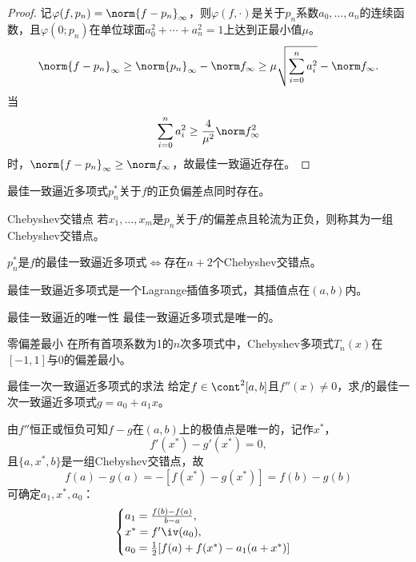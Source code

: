 \begin{proof}
    记$\varphi(f,p_n)=\norm{f-p_n}_\infty$，则$\varphi(f,\cdot)$是关于$p_n$系数$a_0,\ldots,a_n$的连续函数，且$\varphi(0;p_n)$在单位球面$a_0^2+\cdots+a_n^2=1$上达到正最小值$\mu$。
    \[
        \norm{f-p_n}_\infty\geq\norm{p_n}_\infty-\norm f_\infty\geq\mu\sqrt{\sum_{i=0}^na_i^2}-\norm f_\infty.
    \]
    当
    \[
        \sum_{i=0}^na_i^2\geq\frac4{\mu^2}\norm f_\infty^2
    \]
    时，$\norm{f-p_n}_\infty\geq\norm f_\infty$，故最佳一致逼近存在。
\end{proof}

\begin{lemma}
    最佳一致逼近多项式$p_n^*$关于$f$的正负偏差点同时存在。
\end{lemma}

\begin{definition}
    {Chebyshev交错点}{}
    若$x_1,\ldots,x_m$是$p_n$关于$f$的偏差点且轮流为正负，则称其为一组Chebyshev交错点。
\end{definition}

\begin{theorem}
    {}{}
    $p_n^*$是$f$的最佳一致逼近多项式$\iff$存在$n+2$个Chebyshev交错点。
\end{theorem}

\begin{corollary}
    最佳一致逼近多项式是一个Lagrange插值多项式，其插值点在$(a,b)$内。
\end{corollary}

\begin{theorem}
    {最佳一致逼近的唯一性}{}
    最佳一致逼近多项式是唯一的。
\end{theorem}

\begin{theorem}
    {零偏差最小}{}
    在所有首项系数为1的$n$次多项式中，Chebyshev多项式$T_n(x)$在$[-1,1]$与0的偏差最小。
\end{theorem}

\begin{example}
    {最佳一次一致逼近多项式的求法}{}
    给定$f\in\cont^2[a,b]$且$f''(x)\neq 0$，求$f$的最佳一次一致逼近多项式$g=a_0+a_1x$。

    由$f''$恒正或恒负可知$f-g$在$(a,b)$上的极值点是唯一的，记作$x^*$，
    \[
        f'(x^*)-g'(x^*)=0,
    \]
    且$\{a,x^*,b\}$是一组Chebyshev交错点，故
    \[
        f(a)-g(a)=-[f(x^*)-g(x^*)]=f(b)-g(b)
    \]
    可确定$a_1,x^*,a_0$：
    \[
        \begin{cases}
            a_1=\frac{f(b)-f(a)}{b-a},\\
            x^*={f'}\iv(a_0),\\
            a_0=\frac12[f(a)+f(x^*)-a_1(a+x^*)]
        \end{cases}
    \]
\end{example}
